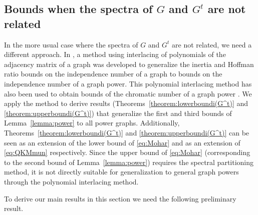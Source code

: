 \documentclass[a4paper,11pt]{article}
\theoremstyle{definition}
\begin{document}
\subsection{Bounds when the spectra of \texorpdfstring{$G$}{G} and \texorpdfstring{$G^t$}{Gt} are not related}\label{sec:unrelatedspectra}

In the more usual case where the spectra of $G$ and $G^t$ are not related, we need a different approach. In \cite{acf2019}, a method using interlacing of polynomials of the adjacency matrix of a graph was developed to generalize the inertia and Hoffman ratio bounds on the independence number of a graph to bounds on the independence number of a graph power. This polynomial interlacing method has also been used to obtain bounds of the chromatic number of a graph power \cite{acfnz21}. We apply the method to derive results (Theorems~\ref{theorem:lowerboundi(G^t)} and \ref{theorem:upperboundi(G^t)}) that generalize the first and third bounds of Lemma~\ref{lemma:power} to all power graphs. Additionally, Theorems~\ref{theorem:lowerboundi(G^t)} and \ref{theorem:upperboundi(G^t)} can be seen as an extension of the lower bound of \eqref{eq:Mohar} and as an extension of \eqref{eq:QKMmun} respectively. Since the upper bound of \eqref{eq:Mohar} (corresponding to the second bound of Lemma~\ref{lemma:power}) requires the spectral partitioning method, it is not directly suitable for generalization to general graph powers through the polynomial interlacing method.


To derive our main results in this section we need the following preliminary result.
\end{document}
